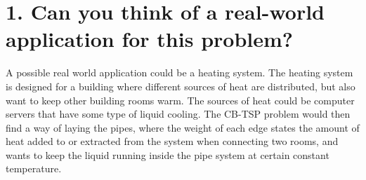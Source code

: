\section*{1. Can you think of a real-world application for this problem?}

A possible real world application could be a heating system. The heating system is designed for a building where different sources of heat are distributed, but also want to keep other building rooms warm. The sources of heat could be computer servers that have some type of liquid cooling. 
The CB-TSP problem would then find a way of laying the pipes, where the weight of each edge states the amount of heat added to or extracted from the system when connecting two rooms, and wants to keep the liquid running inside the pipe system at certain constant temperature.